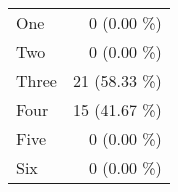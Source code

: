 \begin{tabular}{ l  r }
One & 0 (0.00 \%)\\
Two & 0 (0.00 \%)\\
Three & 21 (58.33 \%)\\
Four & 15 (41.67 \%)\\
Five & 0 (0.00 \%)\\
Six & 0 (0.00 \%)\\
\end{tabular}